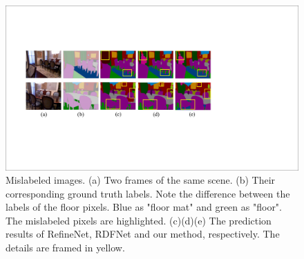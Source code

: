 \begin{figure}[!htbp]
	\setlength{\abovecaptionskip}{-0.2cm}
	\setlength{\belowcaptionskip}{-10cm}
	\centering
	\includegraphics[scale=0.4]{figure/Mislabels.pdf}
	\caption{Mislabeled images. (a) Two frames of the same scene. (b) Their corresponding ground truth labels. Note the difference between the labels of the floor pixels. Blue as "floor mat" and green as "floor".  The mislabeled pixels are highlighted. (c)(d)(e) The prediction results of RefineNet, RDFNet and our method, respectively. The details are framed in yellow.}
	\label{fig:mislabels}
\end{figure}
%

